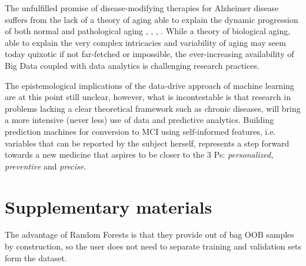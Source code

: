 \documentclass[preprint,12pt]{elsarticle}
\begin{document}
The unfulfilled promise of disease-modifying therapies for Alzheimer disease suffers from the lack of a theory of aging able to explain the dynamic progression of both normal and pathological aging \cite{cerella1985information}, \cite{mangel2001complex}, \cite{sleimen2014aging}, \cite{cohen2016complex}.
While a theory of biological aging, able to explain the very complex intricacies and variability of aging may seem today quixotic if not far-fetched or impossible, the ever-increasing availability of Big Data coupled with data analytics is challenging research practices. 

The epistemological implications of the data-drive approach of machine learning are at this point still unclear, however, what is incontestable is that research in problems lacking a clear theoretical framework such as chronic diseases, will bring a more intensive (never less) use of data and predictive analytics. Building prediction machines for conversion to MCI using self-informed features, i.e. variables that can be reported by the subject herself, represents a step forward towards a new medicine that aspires to be closer to the 3 Ps: \emph{personalized, preventive} and \emph{precise}. 










\newpage
\appendix
\section{Supplementary materials}

The advantage of Random Forests is that they provide out of bag OOB samples by construction, so the user does not need to separate training and validation sets form the dataset. 
\end{document}

